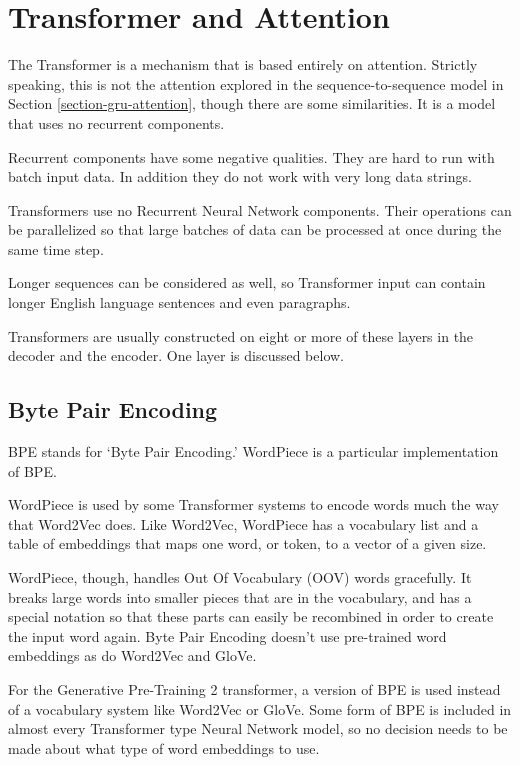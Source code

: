 
\label{chapter-transformer}

\section{Transformer and Attention}

\label{transformer-intro}

The Transformer is a mechanism that is based entirely on attention. Strictly speaking, this is not the attention explored in the sequence-to-sequence model in Section \ref{section-gru-attention}, though there are some similarities. It is a model that uses no recurrent components.

Recurrent components have some negative qualities. They are hard to run with batch input data. In addition they do not work with very long data strings. 


Transformers use no Recurrent Neural Network components. Their operations can be parallelized so that large batches of data can be processed at once during the same time step. 

Longer sequences can be considered as well, so Transformer input can contain longer English language sentences and even paragraphs. 

Transformers are usually constructed on eight or more of these layers in the decoder and the encoder. One layer is discussed below.

\subsection{Byte Pair Encoding}

\ac{BPE} stands for `Byte Pair Encoding.' WordPiece is a particular implementation of BPE.

WordPiece is used by some Transformer systems to encode words much the way that Word2Vec does. Like Word2Vec, WordPiece  has a vocabulary list and a table of embeddings that maps one word, or token, to a vector of a given size.

WordPiece, though, handles Out Of Vocabulary (\ac{OOV}) words gracefully. It breaks large words into smaller pieces that are in the vocabulary, and has a special notation so that these parts can easily be recombined in order to create the input word again. Byte Pair Encoding doesn't use pre-trained word embeddings as do Word2Vec and GloVe.

For the Generative Pre-Training 2 transformer, a version of BPE is used instead of a vocabulary system like Word2Vec or GloVe. Some form of BPE is included in almost every Transformer type Neural Network model, so no decision needs to be made about what type of word embeddings to use.

